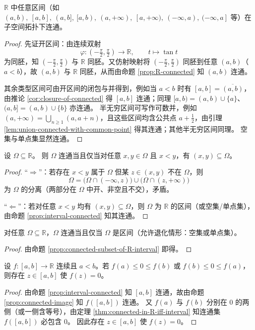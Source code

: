 \documentclass[lang=cn,a4paper,newtx,figureplace=section,tableplace=section]{elegantbook}
\begin{document}
\begin{proposition}\label{prop:interval-connected}
  $\mathbb R$ 中任意区间（如 $(a,b),\ [a,b],\ (a,b],\ [a,b),\ (a,+\infty),\ [a,+\infty),\ (-\infty,a),\ (-\infty,a]$ 等）在子空间拓扑下连通。
\end{proposition}
\begin{proof}
  先证开区间：由连续双射
  \[
    \varphi:(-\tfrac\pi2,\tfrac\pi2)\to\mathbb R,\qquad t\mapsto\tan t
  \]
  为同胚，知 $(-\tfrac\pi2,\tfrac\pi2)$ 与 $\mathbb R$ 同胚。又仿射映射将 $(-\tfrac\pi2,\tfrac\pi2)$ 同胚到任意 $(a,b)$（$a<b$），故 $(a,b)$ 与 $\mathbb R$ 同胚，从而由命题 \ref{prop:R-connected} 知 $(a,b)$ 连通。

  其余类型区间可由开区间的闭包与并得到，例如当 $a<b$ 时有 $[a,b]=\overline{(a,b)}$，由推论 \ref{cor:closure-of-connected} 得 $[a,b]$ 连通；同理 $[a,b)=(a,b)\cup\{a\}$、$(a,b]=(a,b)\cup\{b\}$ 亦连通。
  半无穷区间可写作可数并，例如 $(a,+\infty)=\bigcup_{n\ge 1}(a,a+n)$，且这些区间均含公共点 $a+\tfrac12$，由引理 \ref{lem:union-connected-with-common-point} 得其连通；其他半无穷区间同理。
  空集与单点集显然连通。
\end{proof}

\begin{proposition}\label{prop:connected-subset-of-R-interval}
  设 $\Omega\subseteq\mathbb R$。
  则 $\Omega$ 连通当且仅当对任意 $x,y\in\Omega$ 且 $x<y$，有 $(x,y)\subseteq\Omega$。
\end{proposition}
\begin{proof}
  “$\Rightarrow$”：若存在 $x<y$ 属于 $\Omega$ 但某 $z\in(x,y)$ 不在 $\Omega$，则
  \[
    \Omega=\big(\Omega\cap(-\infty,z)\big)\cup\big(\Omega\cap(z,+\infty)\big)
  \]
  为 $\Omega$ 的分离（两部分在 $\Omega$ 中开、非空且不交），矛盾。

  “$\Leftarrow$”：若对任意 $x<y$ 均有 $(x,y)\subseteq\Omega$，则 $\Omega$ 为 $\mathbb R$ 的区间（或空集/单点集），由命题 \ref{prop:interval-connected} 知其连通。
\end{proof}

\begin{theorem}\label{thm:connected-in-R-iff-interval}
  对任意 $\Omega\subseteq\mathbb R$，$\Omega$ 连通当且仅当 $\Omega$ 是区间（允许退化情形：空集或单点集）。
\end{theorem}
\begin{proof}
  由命题 \ref{prop:connected-subset-of-R-interval} 即得。
\end{proof}

\begin{theorem}[介值定理]\label{thm:ivt}
  设 $f:[a,b]\to\mathbb R$ 连续且 $a<b$。若 $f(a)\le 0\le f(b)$ 或 $f(b)\le 0\le f(a)$，则存在 $z\in[a,b]$ 使 $f(z)=0$。
\end{theorem}
\begin{proof}
  由命题 \ref{prop:interval-connected} 知 $[a,b]$ 连通，故由命题 \ref{prop:connected-image} 知 $f([a,b])$ 连通。
  又 $f(a)$ 与 $f(b)$ 分别在 $0$ 的两侧（或一侧含等号），由定理 \ref{thm:connected-in-R-iff-interval} 知连通集 $f([a,b])$ 必包含 $0$。
  因此存在 $z\in[a,b]$ 使 $f(z)=0$。
\end{proof}
\end{document}
